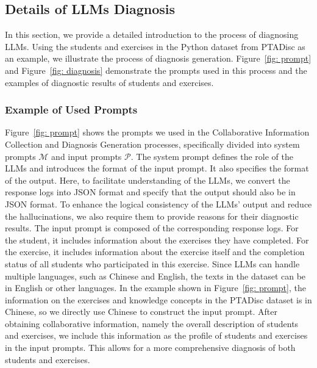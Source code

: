 \subsection{Details of LLMs Diagnosis}
In this section, we provide a detailed introduction to the process of diagnosing LLMs. Using the students and exercises in the Python dataset from PTADisc as an example, we illustrate the process of diagnosis generation. Figure~\ref{fig: prompt} and Figure~\ref{fig: diagnosis} demonstrate the prompts used in this process and the examples of diagnostic results of students and exercises.


\subsubsection{Example of Used Prompts}
Figure~\ref{fig: prompt} shows the prompts we used in the Collaborative Information Collection and Diagnosis Generation processes, specifically divided into system prompts $\mathcal{M}$ and input prompts $\mathcal{P}$. The system prompt defines the role of the LLMs and introduces the format of the input prompt. It also specifies the format of the output. Here, to facilitate understanding of the LLMs, we convert the response logs into JSON format and specify that the output should also be in JSON format. To enhance the logical consistency of the LLMs' output and reduce the hallucinations, we also require them to provide reasons for their diagnostic results.
The input prompt is composed of the corresponding response logs. For the student, it includes information about the exercises they have completed. For the exercise, it includes information about the exercise itself and the completion status of all students who participated in this exercise.
Since LLMs can handle multiple languages, such as Chinese and English, the texts in the dataset can be in English or other languages. In the example shown in Figure~\ref{fig: prompt}, the information on the exercises and knowledge concepts in the PTADisc dataset is in Chinese, so we directly use Chinese to construct the input prompt.
After obtaining collaborative information, namely the overall description of students and exercises, we include this information as the profile of students and exercises in the input prompts. This allows for a more comprehensive diagnosis of both students and exercises.

